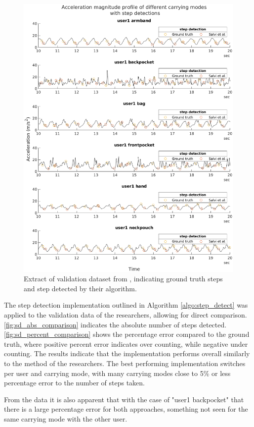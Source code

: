 \begin{figure}[H]
	\centering
	\includegraphics[width=\linewidth]{images/20201112_1318_gt_steps_vs_salvi_steps_1}
	\caption[Step detection validation data]{Extract of validation dataset from \citet{Salvi2018}, indicating ground truth steps and step detected by their algorithm.}
	\label{fig:gt_steps_vs_salvi_steps}
\end{figure}

\newpage
The step detection implementation outlined in Algorithm \ref{algo:step_detect} was applied to the validation data of the researchers, allowing for direct comparison. \cref{fig:sd_abs_comparison} indicates the absolute number of steps detected. \cref{fig:sd_percent_comparison}  shows the percentage error compared to the ground truth, where positive percent error indicates over counting, while negative under counting. The results indicate that the implementation performs overall similarly to the method of the researchers.  The best performing implementation switches per user and carrying mode, with many carrying modes close to 5\% or less percentage error to the number of steps taken. \par 
From the data it is also apparent that with the case of "user1 backpocket" that there is a large percentage error for both approaches, something not seen for the same carrying mode with the other user. 
 
